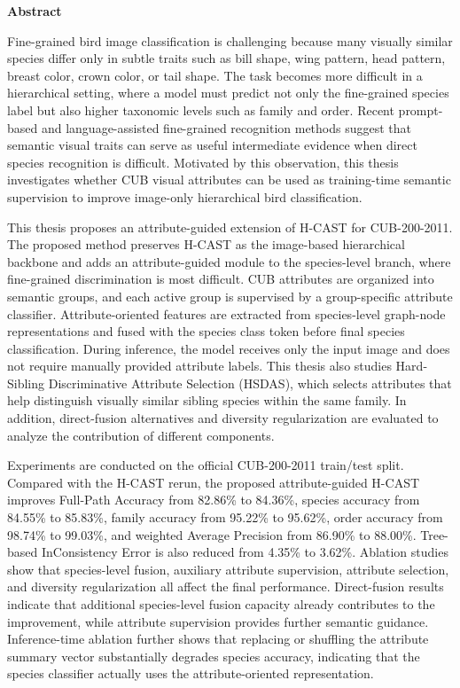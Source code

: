 \begin{center}
\textbf{\large{Abstract}}
\end{center}

\begin{small}

Fine-grained bird image classification is challenging because many visually similar species differ only in subtle traits such as bill shape, wing pattern, head pattern, breast color, crown color, or tail shape. The task becomes more difficult in a hierarchical setting, where a model must predict not only the fine-grained species label but also higher taxonomic levels such as family and order. Recent prompt-based and language-assisted fine-grained recognition methods suggest that semantic visual traits can serve as useful intermediate evidence when direct species recognition is difficult. Motivated by this observation, this thesis investigates whether CUB visual attributes can be used as training-time semantic supervision to improve image-only hierarchical bird classification.

This thesis proposes an attribute-guided extension of H-CAST for CUB-200-2011. The proposed method preserves H-CAST as the image-based hierarchical backbone and adds an attribute-guided module to the species-level branch, where fine-grained discrimination is most difficult. CUB attributes are organized into semantic groups, and each active group is supervised by a group-specific attribute classifier. Attribute-oriented features are extracted from species-level graph-node representations and fused with the species class token before final species classification. During inference, the model receives only the input image and does not require manually provided attribute labels. This thesis also studies Hard-Sibling Discriminative Attribute Selection (HSDAS), which selects attributes that help distinguish visually similar sibling species within the same family. In addition, direct-fusion alternatives and diversity regularization are evaluated to analyze the contribution of different components.

Experiments are conducted on the official CUB-200-2011 train/test split. Compared with the H-CAST rerun, the proposed attribute-guided H-CAST improves Full-Path Accuracy from 82.86\% to 84.36\%, species accuracy from 84.55\% to 85.83\%, family accuracy from 95.22\% to 95.62\%, order accuracy from 98.74\% to 99.03\%, and weighted Average Precision from 86.90\% to 88.00\%. Tree-based InConsistency Error is also reduced from 4.35\% to 3.62\%. Ablation studies show that species-level fusion, auxiliary attribute supervision, attribute selection, and diversity regularization all affect the final performance. Direct-fusion results indicate that additional species-level fusion capacity already contributes to the improvement, while attribute supervision provides further semantic guidance. Inference-time ablation further shows that replacing or shuffling the attribute summary vector substantially degrades species accuracy, indicating that the species classifier actually uses the attribute-oriented representation.


\end{small}
